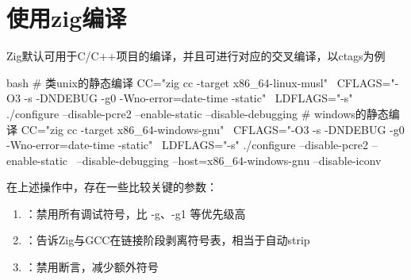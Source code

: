 \section{使用zig编译}
Zig默认可用于C/C++项目的编译，并且可进行对应的交叉编译，以ctags为例
\begin{code-block}{bash}
# 类unix的静态编译
CC="zig cc -target x86_64-linux-musl" \
    CFLAGS="-O3 -s -DNDEBUG -g0 -Wno-error=date-time -static" \
    LDFLAGS="-s" ./configure --disable-pcre2 --enable-static --disable-debugging
# windows的静态编译
CC="zig cc -target x86_64-windows-gnu" \
    CFLAGS="-O3 -s -DNDEBUG -g0 -Wno-error=date-time -static" \
    LDFLAGS="-s" ./configure --disable-pcre2 --enable-static \
    --disable-debugging --host=x86_64-windows-gnu --disable-iconv
\end{code-block}

在上述操作中，存在一些比较关键的参数：
\begin{enumerate}
  \item \codeinlinebg{bash}{-g0}：禁用所有调试符号，比 -g、-g1 等优先级高
  \item {}：告诉Zig与GCC在链接阶段剥离符号表，相当于自动strip
  \item {}：禁用断言，减少额外符号
\end{enumerate}


